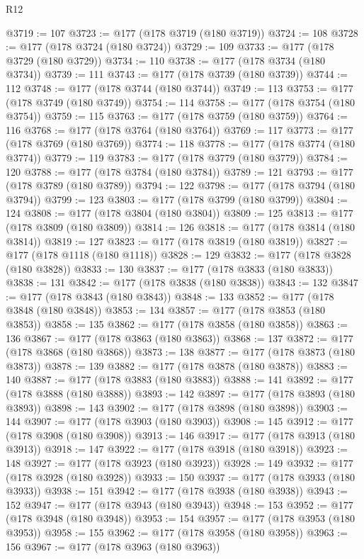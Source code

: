 \begin{lexlean}{R12}
\begin{coremodule}
@3719 := 107
@3723 := @177 (@178 @3719 (@180 @3719))
@3724 := 108
@3728 := @177 (@178 @3724 (@180 @3724))
@3729 := 109
@3733 := @177 (@178 @3729 (@180 @3729))
@3734 := 110
@3738 := @177 (@178 @3734 (@180 @3734))
@3739 := 111
@3743 := @177 (@178 @3739 (@180 @3739))
@3744 := 112
@3748 := @177 (@178 @3744 (@180 @3744))
@3749 := 113
@3753 := @177 (@178 @3749 (@180 @3749))
@3754 := 114
@3758 := @177 (@178 @3754 (@180 @3754))
@3759 := 115
@3763 := @177 (@178 @3759 (@180 @3759))
@3764 := 116
@3768 := @177 (@178 @3764 (@180 @3764))
@3769 := 117
@3773 := @177 (@178 @3769 (@180 @3769))
@3774 := 118
@3778 := @177 (@178 @3774 (@180 @3774))
@3779 := 119
@3783 := @177 (@178 @3779 (@180 @3779))
@3784 := 120
@3788 := @177 (@178 @3784 (@180 @3784))
@3789 := 121
@3793 := @177 (@178 @3789 (@180 @3789))
@3794 := 122
@3798 := @177 (@178 @3794 (@180 @3794))
@3799 := 123
@3803 := @177 (@178 @3799 (@180 @3799))
@3804 := 124
@3808 := @177 (@178 @3804 (@180 @3804))
@3809 := 125
@3813 := @177 (@178 @3809 (@180 @3809))
@3814 := 126
@3818 := @177 (@178 @3814 (@180 @3814))
@3819 := 127
@3823 := @177 (@178 @3819 (@180 @3819))
@3827 := @177 (@178 @1118 (@180 @1118))
@3828 := 129
@3832 := @177 (@178 @3828 (@180 @3828))
@3833 := 130
@3837 := @177 (@178 @3833 (@180 @3833))
@3838 := 131
@3842 := @177 (@178 @3838 (@180 @3838))
@3843 := 132
@3847 := @177 (@178 @3843 (@180 @3843))
@3848 := 133
@3852 := @177 (@178 @3848 (@180 @3848))
@3853 := 134
@3857 := @177 (@178 @3853 (@180 @3853))
@3858 := 135
@3862 := @177 (@178 @3858 (@180 @3858))
@3863 := 136
@3867 := @177 (@178 @3863 (@180 @3863))
@3868 := 137
@3872 := @177 (@178 @3868 (@180 @3868))
@3873 := 138
@3877 := @177 (@178 @3873 (@180 @3873))
@3878 := 139
@3882 := @177 (@178 @3878 (@180 @3878))
@3883 := 140
@3887 := @177 (@178 @3883 (@180 @3883))
@3888 := 141
@3892 := @177 (@178 @3888 (@180 @3888))
@3893 := 142
@3897 := @177 (@178 @3893 (@180 @3893))
@3898 := 143
@3902 := @177 (@178 @3898 (@180 @3898))
@3903 := 144
@3907 := @177 (@178 @3903 (@180 @3903))
@3908 := 145
@3912 := @177 (@178 @3908 (@180 @3908))
@3913 := 146
@3917 := @177 (@178 @3913 (@180 @3913))
@3918 := 147
@3922 := @177 (@178 @3918 (@180 @3918))
@3923 := 148
@3927 := @177 (@178 @3923 (@180 @3923))
@3928 := 149
@3932 := @177 (@178 @3928 (@180 @3928))
@3933 := 150
@3937 := @177 (@178 @3933 (@180 @3933))
@3938 := 151
@3942 := @177 (@178 @3938 (@180 @3938))
@3943 := 152
@3947 := @177 (@178 @3943 (@180 @3943))
@3948 := 153
@3952 := @177 (@178 @3948 (@180 @3948))
@3953 := 154
@3957 := @177 (@178 @3953 (@180 @3953))
@3958 := 155
@3962 := @177 (@178 @3958 (@180 @3958))
@3963 := 156
@3967 := @177 (@178 @3963 (@180 @3963))

\end{coremodule}
\end{lexlean}
